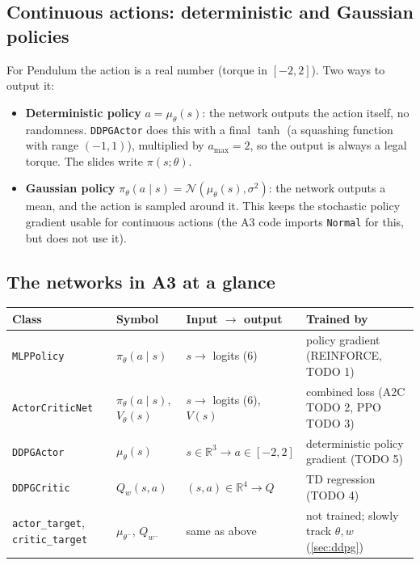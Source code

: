 \documentclass[11pt,a4paper]{article}
\newcommand{\R}{\mathbb{R}}
\newcommand{\pit}{\pi_\theta}
\newcommand{\code}[1]{\texttt{#1}}
\begin{document}
\subsection{Continuous actions: deterministic and Gaussian policies}
For Pendulum the action is a real number (torque in $[-2,2]$). Two ways to output it:
\begin{itemize}[nosep]
  \item \textbf{Deterministic policy} $a=\mu_\theta(s)$: the network outputs the action itself, no randomness. \code{DDPGActor} does this with a final $\tanh$ (a squashing function with range $(-1,1)$), multiplied by $a_{\max}=2$, so the output is always a legal torque. The slides write $\pi(s;\theta)$.
  \item \textbf{Gaussian policy} $\pit(a\mid s)=\mathcal N(\mu_\theta(s),\sigma^2)$: the network outputs a mean, and the action is sampled around it. This keeps the stochastic policy gradient usable for continuous actions (the A3 code imports \code{Normal} for this, but does not use it).
\end{itemize}

\subsection{The networks in A3 at a glance}
\begin{center}
\begingroup
\renewcommand{\arraystretch}{1.2}
\small
\begin{tabularx}{\textwidth}{@{}l l l X@{}}
\toprule
Class & Symbol & Input $\to$ output & Trained by \\
\midrule
\code{MLPPolicy} & $\pit(a\mid s)$ & $s\to$ logits (6) & policy gradient (REINFORCE, TODO 1) \\
\code{ActorCriticNet} & $\pit(a\mid s)$, $V_\theta(s)$ & $s\to$ logits (6), $V(s)$ & combined loss (A2C TODO 2, PPO TODO 3) \\
\code{DDPGActor} & $\mu_\theta(s)$ & $s\in\R^3\to a\in[-2,2]$ & deterministic policy gradient (TODO 5) \\
\code{DDPGCritic} & $Q_w(s,a)$ & $(s,a)\in\R^4\to Q$ & TD regression (TODO 4) \\
\code{actor\_target}, \code{critic\_target} & $\mu_{\theta^-}$, $Q_{w^-}$ & same as above & not trained; slowly track $\theta,w$ (\cref{sec:ddpg}) \\
\bottomrule
\end{tabularx}
\endgroup
\end{center}
\end{document}
